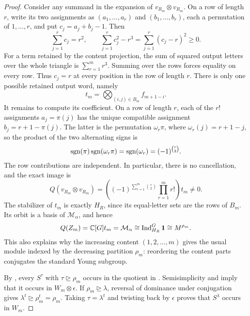 \begin{proof}
Consider any summand in the expansion of $v_{R_m}\otimes v_{R_m}$.
On a row of length $r$, write its two assignments as
$(a_1,\ldots,a_r)$ and $(b_1,\ldots,b_r)$, each a permutation of
$1,\ldots,r$, and put $c_j=a_j+b_j-1$.  Then
\begin{equation}
 \sum_{j=1}^r c_j=r^2,
 \qquad
 \sum_{j=1}^r c_j^2-r^3
 =\sum_{j=1}^r(c_j-r)^2\ge0.
 \label{dom:square-minimum}
\end{equation}
For a term retained by the content projection, the sum of squared output
letters over the whole triangle is $\sum_{r=1}^m r^3$.
Summing  over the rows forces equality on every
row.  Thus $c_j=r$ at every position in the row of length $r$.
There is only one possible retained output word, namely
\[
 t_m=\bigotimes_{(i,j)\in B_m}f_{m+1-i}.
\]
It remains to compute its coefficient.  On a row of length $r$, each of
the $r!$ assignments $a_j=\pi(j)$ has the unique compatible assignment
$b_j=r+1-\pi(j)$.  The latter is the permutation $\omega_r\pi$, where
$\omega_r(j)=r+1-j$, so the product of the two alternating signs is
\[
 \operatorname{sgn}(\pi)\operatorname{sgn}(\omega_r\pi)
 =\operatorname{sgn}(\omega_r)=(-1)^{\binom r2}.
\]
The row contributions are independent.  In particular, there is no
cancellation, and the exact image is
\begin{equation}
 Q(v_{R_m}\otimes v_{R_m})
 =\left((-1)^{\sum_{r=1}^m\binom r2}\prod_{r=1}^m r!\right)t_m\ne0.
 \label{dom:noncancellation}
\end{equation}
The stabilizer of $t_m$ is exactly $H_R$, since its equal-letter sets are
the rows of $B_m$.  Its orbit is a basis of $\mathcal M_\alpha$, and hence
\begin{equation}
 Q(Z_m)=\mathbb C[G]t_m=\mathcal M_\alpha
 \cong\operatorname{Ind}_{H_R}^{G}\mathbf1\cong M^{\rho_m}.
 \label{dom:permutation-quotient}
\end{equation}
This also explains why the increasing content $(1,2,\ldots,m)$ gives the
usual module indexed by the decreasing partition $\rho_m$: reordering
the content parts conjugates the standard Young subgroup.

By , every $S^\tau$ with $\tau\unrhd\rho_m$ occurs in
the quotient in .  Semisimplicity and
 imply that it occurs in $W_m\otimes\epsilon$.
If $\rho_m\unrhd\lambda$, reversal of dominance under conjugation gives
$\lambda^t\unrhd\rho_m^t=\rho_m$.  Taking $\tau=\lambda^t$ and twisting
back by $\epsilon$ proves that $S^\lambda$ occurs in $W_m$.
\end{proof}
